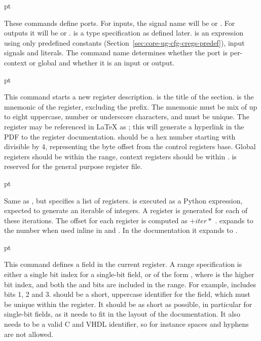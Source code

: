 pt




\noindent These commands define ports. For inputs, the signal name will be 
 or . For outputs it will be 
 or .  is a 
type specification as defined later.  is an expression using only 
predefined constants (Section~\ref{sec:core-ug-cfg-cregs-predef}), input signals 
and literals. The command name determines whether the port is per-context or 
global and whether it is an input or output.

 pt

\noindent This command starts a new register description.  is the 
title of the section.  is the mnemonic of the register, 
excluding the  prefix. The mnemonic must be mix of up to eight 
uppercase, number or underscore characters, and must be unique. The register may 
be referenced in LaTeX as ; this will generate a 
hyperlink in the PDF to the register documentation.  should be a 
hex number starting with  divisible by 4, representing the byte offset 
from the control registers base. Global registers should be within the 
 range, context registers should be within 
.  is reserved for the general purpose 
register file.

 pt

\noindent Same as \code{\register}, but specifies a list of registers. 
 is executed as a Python expression, expected to generate 
an iterable of integers. A register is generated for each of these iterations. 
The offset for each register is computed as  $+ iter *$ 
. \code{\n{}} expands to the number when used inline in 
 and . In the documentation it expands to 
.

 pt

\noindent This command defines a field in the current register. A range 
specification is either a single bit index for a single-bit field, or of the 
form , where  is the higher bit index, and both 
the  and  bits are included in the range. For example, 
 includes bits 1, 2 and 3.  should be a short, 
uppercase identifier for the field, which must be unique within the register. It 
should be as short as possible, in particular for single-bit fields, as it needs 
to fit in the layout of the documentation. It also needs to be a valid C and 
VHDL identifier, so for instance spaces and hyphens are not allowed.

